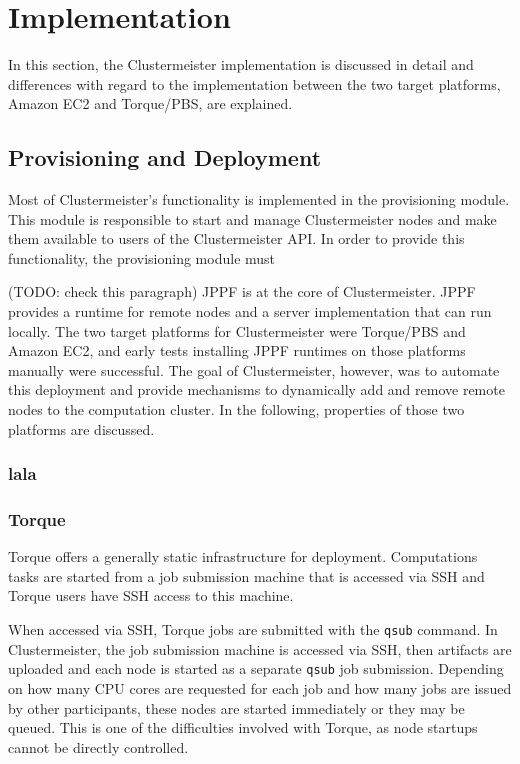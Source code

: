 \documentclass[12pt]{article}
\begin{document}
\section{Implementation}
\label{implementation}

In this section, the Clustermeister implementation is discussed in detail and differences with regard to the implementation between the two target platforms, Amazon EC2 and Torque/PBS, are explained.

\subsection{Provisioning and Deployment}
Most of Clustermeister's functionality is implemented in the provisioning module. This module is responsible to start and manage Clustermeister nodes and make them available to users of the Clustermeister API. In order to provide this functionality, the provisioning module must   

(TODO: check this paragraph)
JPPF is at the core of Clustermeister. JPPF provides a runtime for remote nodes and a server implementation that can run locally. The two target platforms for Clustermeister were Torque/PBS and Amazon EC2, and early tests installing JPPF runtimes on those platforms manually were successful. The goal of Clustermeister, however, was to automate this deployment and provide mechanisms to dynamically add and remove remote nodes to the computation cluster. In the following, properties of those two platforms are discussed.

\subsubsection{lala}

\subsubsection{Torque}

\label{implementation-torque}

Torque offers a generally static infrastructure for deployment. Computations tasks are started from a job submission machine that is accessed via SSH and Torque users have SSH access to this machine.

When accessed via SSH, Torque jobs are submitted with the \texttt{qsub} command. In Clustermeister, the job submission machine is accessed via SSH, then artifacts are uploaded and each node is started as a separate \texttt{qsub} job submission. Depending on how many CPU cores are requested for each job and how many jobs are issued by other participants, these nodes are started immediately or they may be queued. This is one of the difficulties involved with Torque, as node startups cannot be directly controlled.
\end{document}
